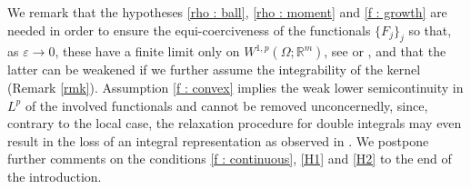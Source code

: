 \documentclass{article}
\theoremstyle{definition}
\newcommand{\e}{\varepsilon}
\newcommand{\R}{\mathbb{R}}
\begin{document}
We remark that the hypotheses \eqref{rho : ball}, \eqref{rho : moment} and \eqref{f : growth} are needed in order to ensure the equi-coerciveness of the functionals $\{F_j\}_j$ so that, as $\e\to0$, these have a finite limit only on $W^{1,p}(\Omega;\R^m)$, see \cite{P2} or \cite{AABPT}, and that the latter can be weakened if we further assume the integrability of the kernel (Remark \ref{rmk}). Assumption \eqref{f : convex} implies the weak lower semicontinuity in $L^p$ of the involved functionals and cannot be removed unconcernedly, since, contrary to the local case, the relaxation procedure for double integrals may even result in the loss of an integral representation as observed in \cite{MT, KZ, B}. We postpone further comments on the conditions \eqref{f : continuous}, \eqref{H1} and \eqref{H2} to the end of the introduction.

\smallskip
\end{document}
